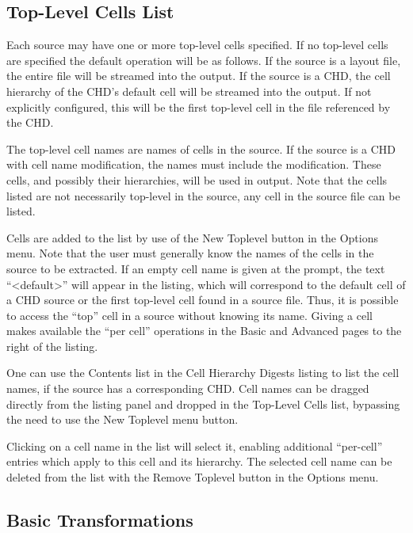 \subsection{Top-Level Cells List}

Each source may have one or more top-level cells specified.  If no
top-level cells are specified the default operation will be as
follows.  If the source is a layout file, the entire file will be
streamed into the output.  If the source is a CHD, the cell hierarchy
of the CHD's default cell will be streamed into the output.  If not
explicitly configured, this will be the first top-level cell in the
file referenced by the CHD.

The top-level cell names are names of cells in the source.  If the
source is a CHD with cell name modification, the names must include
the modification.  These cells, and possibly their hierarchies, will
be used in output.  Note that the cells listed are not necessarily
top-level in the source, any cell in the source file can be listed.

Cells are added to the list by use of the {\cb New Toplevel} button in
the {\cb Options} menu.  Note that the user must generally know the
names of the cells in the source to be extracted.  If an empty cell
name is given at the prompt, the text ``{\vt <default>}'' will
appear in the listing, which will correspond to the default cell of a
CHD source or the first top-level cell found in a source file.  Thus,
it is possible to access the ``top'' cell in a source without knowing
its name.  Giving a cell makes available the ``per cell'' operations
in the {\cb Basic} and {\cb Advanced} pages to the right of the
listing.

One can use the {\cb Contents} list in the {\cb Cell Hierarchy
Digests} listing to list the cell names, if the source has a
corresponding CHD.  Cell names can be dragged directly from the
listing panel and dropped in the {\cb Top-Level Cells} list, bypassing
the need to use the {\cb New Toplevel} menu button.

Clicking on a cell name in the list will select it, enabling
additional ``per-cell'' entries which apply to this cell and its
hierarchy.  The selected cell name can be deleted from the list with
the {\cb Remove Toplevel} button in the {\cb Options} menu.

\subsection{Basic Transformations}

